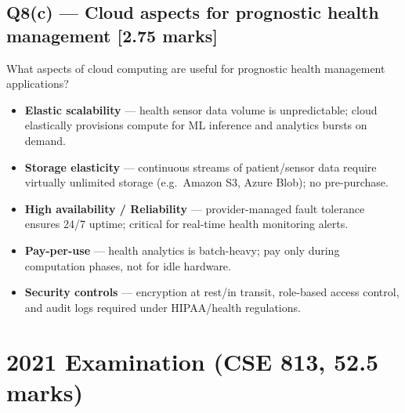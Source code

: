 \documentclass[12pt, a4paper]{article}
\newenvironment{qbox}{\begin{mdframed}[style=qframe]}{\end{mdframed}}
\newenvironment{solbox}{\begin{mdframed}[style=solframe]}{\end{mdframed}}
\newcommand{\qmarks}[1]{\hfill\textbf{\color{orange!70!black}[#1 marks]}}
\begin{document}
\subsection{Q8(c) --- Cloud aspects for prognostic health management
  \texorpdfstring{\qmarks{2.75}}{}}
\begin{qbox}What aspects of cloud computing are useful for prognostic health management
applications?\end{qbox}
\begin{solbox}
\begin{itemize}[leftmargin=1.4cm, itemsep=3pt]
  \item \textbf{Elastic scalability} --- health sensor data volume is unpredictable; cloud
    elastically provisions compute for ML inference and analytics bursts on demand.
  \item \textbf{Storage elasticity} --- continuous streams of patient/sensor data require
    virtually unlimited storage (e.g.\ Amazon S3, Azure Blob); no pre-purchase.
  \item \textbf{High availability / Reliability} --- provider-managed fault tolerance ensures
    24/7 uptime; critical for real-time health monitoring alerts.
  \item \textbf{Pay-per-use} --- health analytics is batch-heavy; pay only during computation
    phases, not for idle hardware.
  \item \textbf{Security controls} --- encryption at rest/in transit, role-based access control,
    and audit logs required under HIPAA/health regulations.
\end{itemize}
\end{solbox}

\section{2021 Examination (CSE 813, 52.5 marks)}

\end{document}
